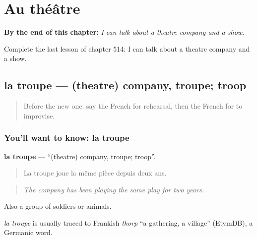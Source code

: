 
\chapter{Au théâtre}
\label{ch:fr-au-theatre}

\begin{chapteropening}
\textbf{By the end of this chapter:} \emph{I can talk about a theatre company and a show.}

Complete the last lesson of chapter 514: I can talk about a theatre company and a show.
\end{chapteropening}

\section[la troupe]{la troupe — (theatre) company, troupe; troop}

\label{lesson:FR-C514-troupe}



\begin{quote}
Before the new one: say the French for rehearsal, then the French for to improvise.
\end{quote}

\subsection*{You'll want to know: la troupe}
\textbf{la troupe} — \textquotedblleft{}(theatre) company, troupe; troop\textquotedblright{}.

\begin{quote}
La troupe joue la même pièce depuis deux ans.
\end{quote}

\begin{quote}
\emph{The company has been playing the same play for two years.}
\end{quote}

Also a group of soldiers or animals.

\begin{cousinweb}
\emph{la troupe} is usually traced to Frankish \emph{thorp} \textquotedblleft{}a gathering, a village\textquotedblright{} (EtymDB), a Germanic word.
\end{cousinweb}

